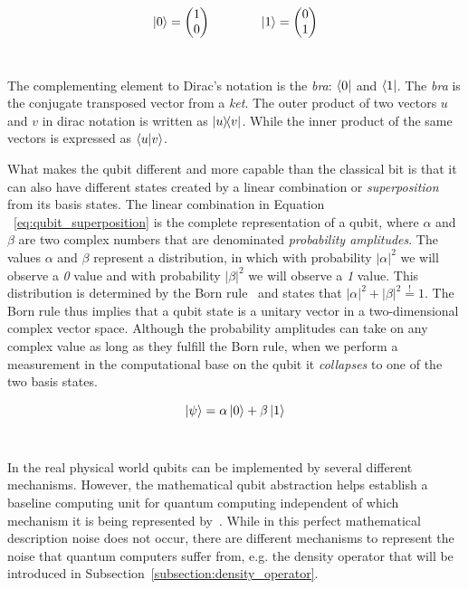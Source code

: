 \begin{equation}\label{eq:qubit_bases}
    \ket{0} = \begin{pmatrix}
                1 \\ 0
              \end{pmatrix} \qquad \qquad
    \ket{1} = \begin{pmatrix}
                0 \\ 1
              \end{pmatrix}
\end{equation} \

The complementing element to Dirac's notation is the \textit{bra}:
\(\bra{0}\) and \(\bra{1}\). The \textit{bra} is the conjugate transposed
vector from a \textit{ket}. The outer product of two vectors \(u\) and
\(v\) in dirac notation is written as \(\ketbra{u}{v}\). While the inner
product of the same vectors is expressed as \(\braket{u}{v}\). \

What makes the qubit different and more capable than
the classical bit is that it can also have different states
created by a linear combination or \textit{superposition} from
its basis states. The linear combination in Equation
~\ref{eq:qubit_superposition} is the complete representation
of a qubit, where \(\alpha\) and \(\beta\) are two complex numbers that
are denominated \textit{probability amplitudes}.
The values \(\alpha\) and \(\beta\) represent a distribution, in which
with probability \(|\alpha|^2\) we will observe a \textit{0}
value and with probability \(|\beta|^2\) we will observe a
\textit{1} value. This distribution is determined by the
Born rule~\cite{born_quantenmechanik_1926} and states that \(|\alpha|^2 + |\beta|^2 \stackrel{!}{=} 1\).
The Born rule thus implies that a qubit state is a unitary vector in
a two-dimensional complex vector space. Although the
probability amplitudes can take on any complex value as long
as they fulfill the Born rule, when we perform a measurement
in the computational base on the qubit it \textit{collapses}
to one of the two basis states. \

\begin{equation}\label{eq:qubit_superposition}
  \ket{\psi} = \alpha\ket{0} + \beta\ket{1}
\end{equation} \

In the real physical world qubits can be implemented by
several different mechanisms. However, the mathematical
qubit abstraction helps establish a baseline computing unit
for quantum computing independent of which mechanism it is
being represented by~\cite{nielsen_quantum_2010}. While in this perfect
mathematical description noise does not occur, there are
different mechanisms to represent the noise that quantum
computers suffer from, e.g. the density operator that will
be introduced in Subsection~\ref{subsection:density_operator}. \

